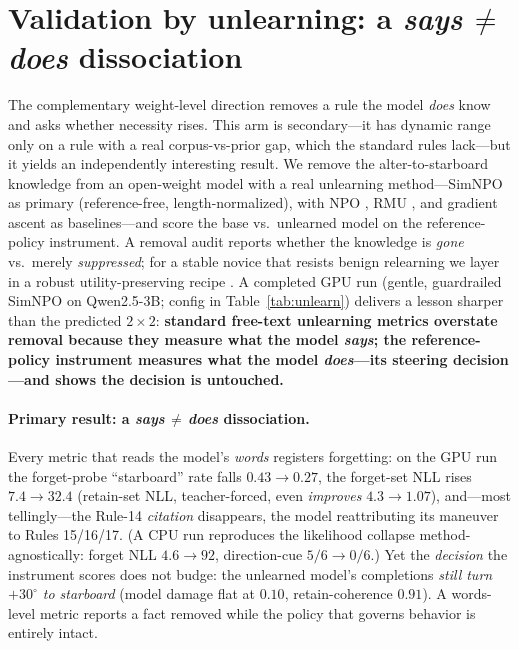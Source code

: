 \documentclass{article}
\begin{document}
\section{Validation by unlearning: a \emph{says\,$\neq$\,does} dissociation}
\label{app:unlearning}
The complementary weight-level direction removes a rule the model \emph{does} know and asks whether
necessity rises. This arm is secondary---it has dynamic range only on a rule with a real
corpus-vs-prior gap, which the standard rules lack---but it yields an independently interesting result.
We remove the alter-to-starboard knowledge from an open-weight model with a real unlearning
method---SimNPO \citep{simnpo2024} as primary (reference-free, length-normalized), with NPO
\citep{npo2024}, RMU \citep{rmu2024}, and gradient ascent \citep{ga2023} as baselines---and score the
base vs.\ unlearned model on the reference-policy instrument. A removal audit \citep{lynch2024} reports
whether the knowledge is \emph{gone} vs.\ merely \emph{suppressed}; for a stable novice that resists
benign relearning we layer in a robust utility-preserving recipe \citep{unlearninglasts2025}. A
completed GPU run (gentle, guardrailed SimNPO on Qwen2.5-3B; config in Table~\ref{tab:unlearn})
delivers a lesson sharper than the predicted $2\times2$: \textbf{standard free-text unlearning metrics
overstate removal because they measure what the model \emph{says}; the reference-policy instrument
measures what the model \emph{does}---its steering decision---and shows the decision is untouched.}

\paragraph{Primary result: a \emph{says\,$\neq$\,does} dissociation.} Every metric that reads the
model's \emph{words} registers forgetting: on the GPU run the forget-probe ``starboard'' rate falls
$0.43\to0.27$, the forget-set NLL rises $7.4\to32.4$ (retain-set NLL, teacher-forced, even
\emph{improves} $4.3\to1.07$), and---most tellingly---the Rule-14 \emph{citation} disappears, the model
reattributing its maneuver to Rules 15/16/17. (A CPU run reproduces the likelihood collapse
method-agnostically: forget NLL $4.6\to92$, direction-cue $5/6\to0/6$.) Yet the \emph{decision} the
instrument scores does not budge: the unlearned model's completions \emph{still turn $+30^\circ$ to
starboard} (model damage flat at $0.10$, retain-coherence $0.91$). A words-level metric reports a fact
removed while the policy that governs behavior is entirely intact.
\end{document}
